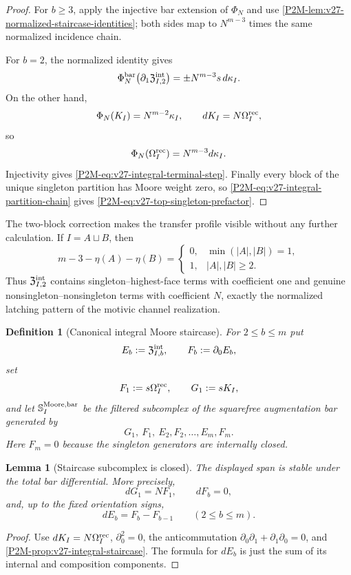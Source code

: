 \documentclass[11pt]{article}
\newtheorem{lemma}[theorem]{Lemma}
\newtheorem{definition}[theorem]{Definition}
\theoremstyle{remark}
\begin{document}
\begin{proof}
For \(b\ge3\), apply the injective bar extension of \(\Phi_N\) and use
\cref{P2M-lem:v27-normalized-staircase-identities}; both sides map to
\(N^{m-3}\) times the same normalized incidence chain.

For \(b=2\), the normalized identity gives
\[
 \Phi_N^{\rm bar}
 \bigl(\partial_1\mathfrak Z^{\rm int}_{I,2}\bigr)
 =
 \pm N^{m-3}s\,d\kappa_I.
\]
On the other hand,
\[
 \Phi_N(K_I)=N^{m-2}\kappa_I,
 \qquad
 dK_I=N\Omega_I^{\rm rec},
\]
so
\[
 \Phi_N(\Omega_I^{\rm rec})
 =
 N^{m-3}d\kappa_I.
\]
Injectivity gives \eqref{P2M-eq:v27-integral-terminal-step}.  Finally every block
of the unique singleton partition has Moore weight zero, so
\eqref{P2M-eq:v27-integral-partition-chain} gives
\eqref{P2M-eq:v27-top-singleton-prefactor}.
\end{proof}

The two-block correction makes the transfer profile visible without any
further calculation.  If \(I=A\sqcup B\), then
\[
 m-3-\eta(A)-\eta(B)
 =
 \begin{cases}
 0,&\min(|A|,|B|)=1,\\
 1,&|A|,|B|\ge2.
 \end{cases}
\]
Thus \(\mathfrak Z^{\rm int}_{I,2}\) contains singleton--highest-face terms
with coefficient one and genuine nonsingleton--nonsingleton terms with
coefficient \(N\), exactly the normalized latching pattern of the motivic
channel realization.

\begin{definition}[Canonical integral Moore staircase]
\label{P2M-def:v27-moore-staircase-subcomplex}
For \(2\le b\le m\) put
\[
 E_b:=\mathfrak Z^{\rm int}_{I,b},
 \qquad
 F_b:=\partial_0E_b,
\]
set
\[
 F_1:=s\Omega_I^{\rm rec},
 \qquad
 G_1:=sK_I,
\]
and let
\(\mathbb S_I^{\rm Moore,bar}\) be the filtered subcomplex of the squarefree
augmentation bar generated by
\[
 G_1,\ F_1,\ E_2,F_2,\ldots,E_m,F_m.
\]
Here \(F_m=0\) because the singleton generators are internally closed.
\end{definition}

\begin{lemma}[Staircase subcomplex is closed]
\label{P2M-lem:v27-moore-staircase-closed}
The displayed span is stable under the total bar differential.  More
precisely,
\[
 dG_1=NF_1,\qquad dF_b=0,
\]
and, up to the fixed orientation signs,
\[
 dE_b=F_b-F_{b-1}
 \qquad(2\le b\le m).
\]
\end{lemma}

\begin{proof}
Use \(dK_I=N\Omega_I^{\rm rec}\),
\(\partial_0^2=0\), the anticommutation
\(\partial_0\partial_1+\partial_1\partial_0=0\), and
\cref{P2M-prop:v27-integral-staircase}.  The formula for \(dE_b\) is just the sum
of its internal and composition components.
\end{proof}
\end{document}
